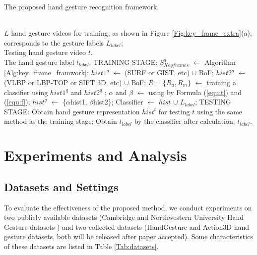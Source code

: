 \documentclass[5p]{elsarticle}
\begin{document}
\begin{algorithm}[!t] \small
	\caption{The proposed hand gesture recognition framework.}
	\label{Alg:whole_framwork}
	\begin{algorithmic}[1]
		\REQUIRE ~~\\
		$L$ hand gesture videos for training, as shown in Figure \ref{Fig:key_frame_extra}(a), corresponds to the gesture labels $L_\mathit{label}$; \\
		Testing hand gesture video $t$.
		\ENSURE ~~\\
		The hand gesture label $t_\mathit{label}$.
		\STATE TRAINING STAGE:
		\STATE $S_\mathit{Keyframes}^{q}$ $\gets$ Algorithm \ref{Alg:key_frame_framwork}; \label{Code:key_frame_extrat}
		\STATE ${hist1}^q$ $\gets$ (SURF or GIST, etc) $\cup$ BoF; \label{Code:app_extrat}
		\STATE ${hist2}^q$ $\gets$ (VLBP or LBP-TOP or SIFT 3D, etc) $\cup$ BoF; \label{Code:mon_extrat}
		\STATE $R= \{R_a, R_m\}$ $\gets$ training a classifier using ${hist1}^q$ and ${hist2}^q$ ; \label{Code:r}
		\STATE $\alpha$ and $\beta$ $\gets$ using by Formula (\ref{equ:t}) and (\ref{equ:f}); \label{Code:alp_bet}
		\STATE ${hist}^q$ $\gets$ \{$\alpha$hist1, $\beta$hist2\}; \label{Code:concatenated}
		\ENDFOR
		\STATE Classifier $\gets$ ${hist}$ $\cup$ $L_\mathit{label}$; \label{Code:class}
		\STATE TESTING STAGE:
		\STATE Obtain hand gesture representation ${hist}^t$ for testing $t$ using the same method as the training stage; \label{Code:test}
		\STATE Obtain $t_\mathit{label}$ by the classifier after calculation; \label{Code:predict}
		\RETURN $t_\mathit{label}$.
	\end{algorithmic}
\end{algorithm}


\section{Experiments and Analysis}
\label{sec:exper}

\subsection{Datasets and Settings}
To evaluate the effectiveness of the proposed method, we conduct experiments on two publicly available datasets (Cambridge \cite{kim2007tensor} and Northwestern University Hand Gesture datasets \cite{shen2012dynamic}) and two collected datasets (HandGesture and Action3D hand gesture datasets, both will be released after paper accepted).
Some characteristics of these datasets are listed in Table \ref{Tab:datasets}.
\end{document}
